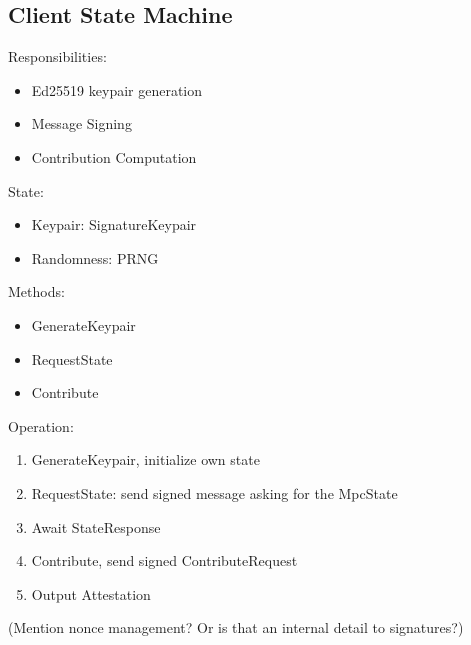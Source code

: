 \subsection{Client State Machine}
Responsibilities:
\begin{itemize}
    \item Ed25519 keypair generation
    \item Message Signing
    \item Contribution Computation
\end{itemize}
State:
\begin{itemize}
    \item Keypair: SignatureKeypair
    \item Randomness: PRNG
\end{itemize}
Methods:
\begin{itemize}
    \item GenerateKeypair
    \item RequestState
    \item Contribute
\end{itemize}
Operation:
\begin{enumerate}
    \item GenerateKeypair, initialize own state
    \item RequestState: send signed message asking for the MpcState
    \item Await StateResponse 
    \item Contribute, send signed ContributeRequest
    \item Output Attestation
\end{enumerate}
(Mention nonce management? Or is that an internal detail to signatures?)
